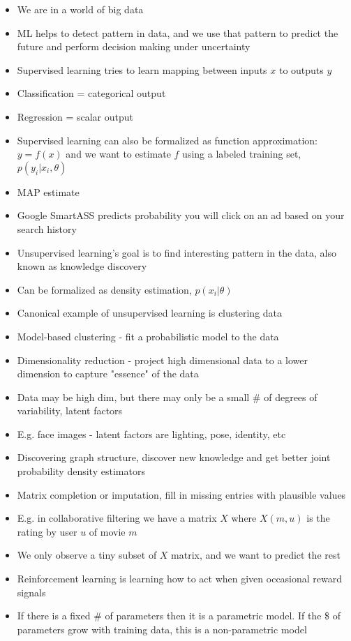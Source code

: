\documentclass[../main.tex]{subfiles}
\begin{document}
\begin{itemize}
  \item We are in a world of big data
  \item ML helps to detect pattern in data, and we use that pattern to predict the future and perform decision making under uncertainty
  \item Supervised learning tries to learn mapping between inputs $x$ to outputs $y$
  \item Classification = categorical output
  \item Regression = scalar output
  \item Supervised learning can also be formalized as function approximation: $y = f(x)$ and we want to estimate $f$ using a labeled training set, $p(y_{i}|x_{i}, \theta)$
  \item MAP estimate
  \item Google SmartASS predicts probability you will click on an ad based on your search history
  \item Unsupervised learning's goal is to find interesting pattern in the data, also known as knowledge discovery
  \item Can be formalized as density estimation, $p(x_{i}|\theta)$
  \item Canonical example of unsupervised learning is clustering data
  \item Model-based clustering - fit a probabilistic model to the data
  \item Dimensionality reduction - project high dimensional data to a lower dimension to capture "essence" of the data
  \item Data may be high dim, but there may only be a small \# of degrees of variability, latent factors
  \item E.g. face images - latent factors are lighting, pose, identity, etc
  \item Discovering graph structure, discover new knowledge and get better joint probability density estimators
  \item Matrix completion or imputation, fill in missing entries with plausible values
  \item E.g. in collaborative filtering we have a matrix $X$ where $X(m,u)$ is the rating by user $u$ of movie $m$
  \item We only observe a tiny subset of $X$ matrix, and we want to predict the rest
  \item Reinforcement learning is learning how to act when given occasional reward signals
  \item If there is a fixed \# of parameters then it is a parametric model. If the \$ of parameters grow with training data, this is a non-parametric model

\end{itemize}
\end{document}
